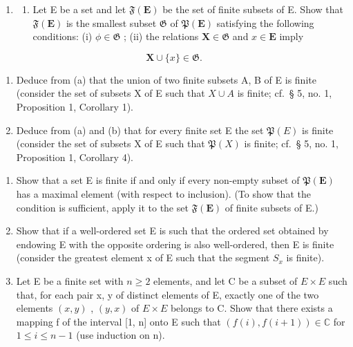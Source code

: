 \exercisegroup

\begin{enumerate}
\def\labelenumi{\arabic{enumi}.}
\tightlist
\item
  \begin{enumerate}
  \def\labelenumii{(\alph{enumii})}
  \tightlist
  \item
    Let E be a set and let \(\mathfrak{F}(\mathbf{E})\) be the set of finite subsets of E. Show that \(\mathfrak{F}(\mathbf{E})\) is the smallest subset \(\mathfrak{G}\) of \(\mathfrak{P}(\mathbf{E})\) satisfying the following conditions: (i) \(\phi \in \mathfrak{G}\) ; (ii) the relations \(\mathbf{X} \in \mathfrak{G}\) and \(x \in \mathbf{E}\) imply
  \end{enumerate}
\end{enumerate}

\[
\mathbf {X} \cup \{x \} \in \mathfrak {G}.
\]

\begin{enumerate}
\def\labelenumi{(\alph{enumi})}
\setcounter{enumi}{1}
\item
  Deduce from (a) that the union of two finite subsets A, B of E is finite (consider the set of subsets X of E such that \(X \cup A\) is finite; cf.~§ 5, no. 1, Proposition 1, Corollary 1).
\item
  Deduce from (a) and (b) that for every finite set E the set \(\mathfrak{P}(E)\) is finite (consider the set of subsets X of E such that \(\mathfrak{P}(X)\) is finite; cf.~§ 5, no. 1, Proposition 1, Corollary 4).
\end{enumerate}

\begin{enumerate}
\def\labelenumi{\arabic{enumi}.}
\setcounter{enumi}{1}
\item
  Show that a set E is finite if and only if every non-empty subset of \(\mathfrak{P}(\mathbf{E})\) has a maximal element (with respect to inclusion). (To show that the condition is sufficient, apply it to the set \(\mathfrak{F}(\mathbf{E})\) of finite subsets of E.)
\item
  Show that if a well-ordered set E is such that the ordered set obtained by endowing E with the opposite ordering is also well-ordered, then E is finite (consider the greatest element x of E such that the segment \(S_{x}\) is finite).
\item
  Let E be a finite set with \(n \geqslant 2\) elements, and let C be a subset of \(E \times E\) such that, for each pair x, y of distinct elements of E, exactly one of the two elements \((x, y)\) , \((y, x)\) of \(E \times E\) belongs to C. Show that there exists a mapping f of the interval {[}1, n{]} onto E such that \((f(i), f(i+1)) \in \mathbb{C}\) for \(1 \leqslant i \leqslant n - 1\) (use induction on n).
\end{enumerate}

